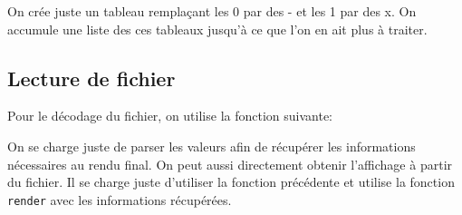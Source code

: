 \documentclass[10pt,a4paper]{article}
\begin{document}


On crée juste un tableau remplaçant les 0 par des - et les 1 par des x. On accumule une liste des ces tableaux jusqu'à ce que l'on en ait plus à traiter.\\

\subsection{Lecture de fichier}

Pour le décodage du fichier, on utilise la fonction suivante:



On se charge juste de parser les valeurs afin de récupérer les informations nécessaires au rendu final. On peut aussi directement obtenir l'affichage à partir du fichier. Il se charge juste d'utiliser la fonction précédente et utilise la fonction \texttt{render} avec les informations récupérées.


\end{document}
